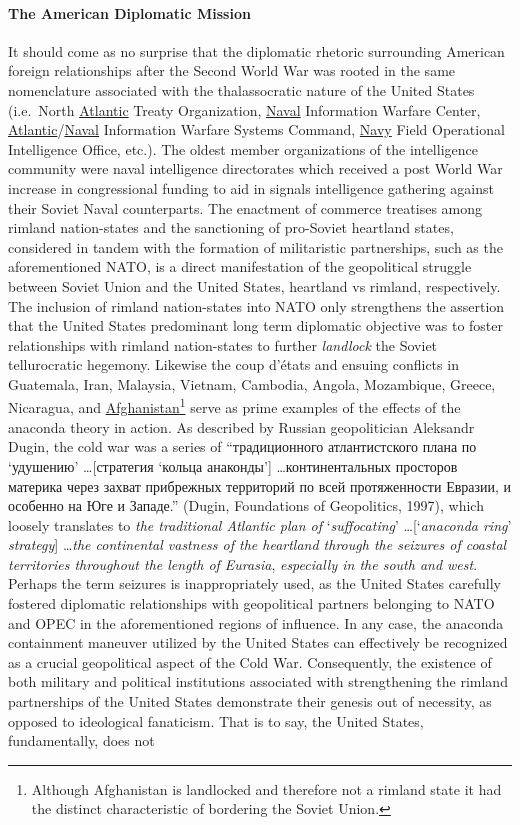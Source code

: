 \documentclass[12pt]{article}
\begin{document}
\paragraph{The American Diplomatic Mission} It should come as no surprise that the diplomatic rhetoric surrounding American foreign relationships after the Second World War was rooted in the same nomenclature associated with the thalassocratic nature of the United States (i.e.\ North \underline{Atlantic} Treaty Organization, \underline{Naval} Information Warfare Center, \underline{Atlantic}/\underline{Naval} Information Warfare Systems Command, \underline{Navy} Field Operational Intelligence Office, etc.). The oldest member organizations of the intelligence community were naval intelligence directorates which received a post World War increase in congressional funding to aid in signals intelligence gathering against their Soviet Naval counterparts. The enactment of commerce treatises among rimland nation-states and the sanctioning of pro-Soviet heartland states, considered in tandem with the formation of militaristic partnerships, such as the aforementioned NATO, is a direct manifestation of the geopolitical struggle between Soviet Union and the United States, heartland vs rimland, respectively. The inclusion of rimland nation-states into NATO only strengthens the assertion that the United States predominant long term diplomatic objective was to foster relationships with rimland nation-states to further \emph{landlock} the Soviet tellurocratic hegemony. Likewise the coup d'\'etats and ensuing conflicts in Guatemala, Iran, Malaysia, Vietnam, Cambodia, Angola, Mozambique, Greece, Nicaragua, and \underline{Afghanistan}\footnote{Although Afghanistan is landlocked and therefore not a rimland state it had the distinct characteristic of bordering the Soviet Union.} serve as prime examples of the effects of the anaconda theory in action. As described by Russian geopolitician Aleksandr Dugin, the cold war was a series of “традиционного атлантистского плана по `удушению'  \dots [стратегия `кольца анаконды'] \dots континентальных просторов материка через захват прибрежных территорий по всей протяженности Евразии, и особенно на Юге и Западе.” (Dugin, Foundations of Geopolitics, 1997), which loosely translates to \emph{the traditional Atlantic plan of} `\emph{suffocating}' \dots [`\emph{anaconda ring}' \emph{strategy}] \dots \emph{the continental vastness of the heartland through the seizures of coastal territories throughout the length of Eurasia}, \emph{especially in the south and west}. Perhaps the term seizures is inappropriately used, as the United States carefully fostered diplomatic relationships with geopolitical partners belonging to NATO and OPEC in the aforementioned regions of influence. In any case, the anaconda containment maneuver utilized by the United States can effectively be recognized as a crucial geopolitical aspect of the Cold War. Consequently, the existence of both military and political institutions associated with strengthening the rimland partnerships of the United States demonstrate their genesis out of necessity, as opposed to ideological fanaticism. That is to say, the United States, fundamentally, does not 
\end{document}
